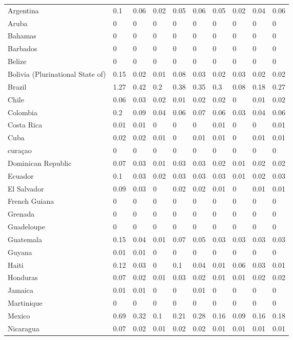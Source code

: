 \begin{longtable}[t]{llllllllll}
Argentina & 0.1 & 0.06 & 0.02 & 0.05 & 0.06 & 0.05 & 0.02 & 0.04 & 0.06\\
Aruba & 0 & 0 & 0 & 0 & 0 & 0 & 0 & 0 & 0\\
Bahamas & 0 & 0 & 0 & 0 & 0 & 0 & 0 & 0 & 0\\
Barbados & 0 & 0 & 0 & 0 & 0 & 0 & 0 & 0 & 0\\
Belize & 0 & 0 & 0 & 0 & 0 & 0 & 0 & 0 & 0\\
Bolivia (Plurinational State of) & 0.15 & 0.02 & 0.01 & 0.08 & 0.03 & 0.02 & 0.03 & 0.02 & 0.02\\
Brazil & 1.27 & 0.42 & 0.2 & 0.38 & 0.35 & 0.3 & 0.08 & 0.18 & 0.27\\
Chile & 0.06 & 0.03 & 0.02 & 0.01 & 0.02 & 0.02 & 0 & 0.01 & 0.02\\
Colombia & 0.2 & 0.09 & 0.04 & 0.06 & 0.07 & 0.06 & 0.03 & 0.04 & 0.06\\
Costa Rica & 0.01 & 0.01 & 0 & 0 & 0 & 0.01 & 0 & 0 & 0.01\\
Cuba & 0.02 & 0.02 & 0.01 & 0 & 0.01 & 0.01 & 0 & 0.01 & 0.01\\
curaçao & 0 & 0 & 0 & 0 & 0 & 0 & 0 & 0 & 0\\
Dominican Republic & 0.07 & 0.03 & 0.01 & 0.03 & 0.03 & 0.02 & 0.01 & 0.02 & 0.02\\
Ecuador & 0.1 & 0.03 & 0.02 & 0.03 & 0.03 & 0.03 & 0.01 & 0.02 & 0.03\\
El Salvador & 0.09 & 0.03 & 0 & 0.02 & 0.02 & 0.01 & 0 & 0.01 & 0.01\\
French Guiana & 0 & 0 & 0 & 0 & 0 & 0 & 0 & 0 & 0\\
Grenada & 0 & 0 & 0 & 0 & 0 & 0 & 0 & 0 & 0\\
Guadeloupe & 0 & 0 & 0 & 0 & 0 & 0 & 0 & 0 & 0\\
Guatemala & 0.15 & 0.04 & 0.01 & 0.07 & 0.05 & 0.03 & 0.03 & 0.03 & 0.03\\
Guyana & 0.01 & 0.01 & 0 & 0 & 0 & 0 & 0 & 0 & 0\\
Haiti & 0.12 & 0.03 & 0 & 0.1 & 0.04 & 0.01 & 0.06 & 0.03 & 0.01\\
Honduras & 0.07 & 0.02 & 0.01 & 0.03 & 0.02 & 0.01 & 0.01 & 0.02 & 0.02\\
Jamaica & 0.01 & 0.01 & 0 & 0 & 0.01 & 0 & 0 & 0 & 0\\
Martinique & 0 & 0 & 0 & 0 & 0 & 0 & 0 & 0 & 0\\
Mexico & 0.69 & 0.32 & 0.1 & 0.21 & 0.28 & 0.16 & 0.09 & 0.16 & 0.18\\
Nicaragua & 0.07 & 0.02 & 0.01 & 0.02 & 0.02 & 0.01 & 0.01 & 0.01 & 0.01\\

\end{longtable}
